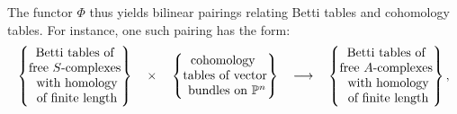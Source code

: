 \documentclass[12pt]{amsart}
\theoremstyle{definition}
\theoremstyle{remark}
\newcommand{\PP}{\mathbb{P}}
\newcommand{\cE}{\mathcal{E}}
\newcommand{\FF}{\mathbf{F}}
\begin{document}
The functor $\Phi$ thus yields bilinear pairings relating Betti tables and cohomology tables.  For instance, one such pairing has the form:
\begin{equation*}%
\label{eqn:**}
\begin{tabular}{c c c c c}
$\left\{\begin{matrix}
\text{Betti tables of} \\ \text{free $S$-complexes}\\
\text{ with homology}\\ \text{ of finite length}
\end{matrix}\right\}$
&
$\times$
&
$\left\{\begin{matrix}
\text{cohomology }\\
\text{tables of vector}\\
\text{ bundles on } \PP^n
\end{matrix}\right\}$
&
$\longrightarrow$
&
$\left\{\begin{matrix}
\text{Betti tables of} \\ \text{free $A$-complexes}\\
\text{ with homology}\\ \text{ of finite length}
\end{matrix}\right\},$
\end{tabular}
\end{equation*}
\end{document}
